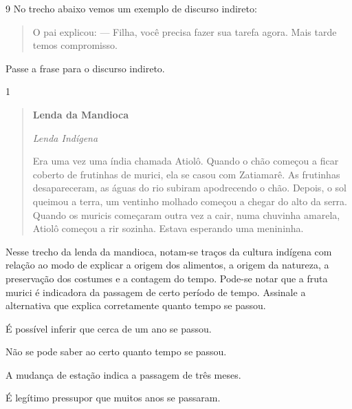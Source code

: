 \num{9} No trecho abaixo vemos um exemplo de discurso indireto:

\begin{quote}

O pai explicou: 
--- Filha, você precisa fazer sua tarefa agora. Mais tarde
temos compromisso.

\end{quote}

Passe a frase para o discurso indireto.



\num{1}

\begin{quote}

\textbf{Lenda da Mandioca}

\emph{Lenda Indígena}

Era uma vez uma índia chamada Atiolô. Quando o chão começou a ficar
coberto de frutinhas de murici, ela se casou com Zatiamarê. As frutinhas
desapareceram, as águas do rio subiram apodrecendo o chão. Depois, o sol
queimou a terra, um ventinho molhado começou a chegar do alto da serra.
Quando os muricis começaram outra vez a cair, numa chuvinha amarela,
Atiolô começou a rir sozinha. Estava esperando uma menininha.

\end{quote}


Nesse trecho da lenda da mandioca, notam-se traços da cultura
indígena com relação ao modo de explicar a origem dos alimentos, a
origem da natureza, a preservação dos costumes e a contagem do tempo.
Pode-se notar que a fruta murici é indicadora da passagem de certo 
período de tempo. Assinale a alternativa que explica corretamente 
quanto tempo se passou.

\begin{escolha}

  \item É possível inferir que cerca de um ano se passou.
  
  \item Não se pode saber ao certo quanto tempo se passou.
  
  \item A mudança de estação indica a passagem de três meses.  
  
  \item É legítimo pressupor que muitos anos se passaram. 

\end{escolha}


